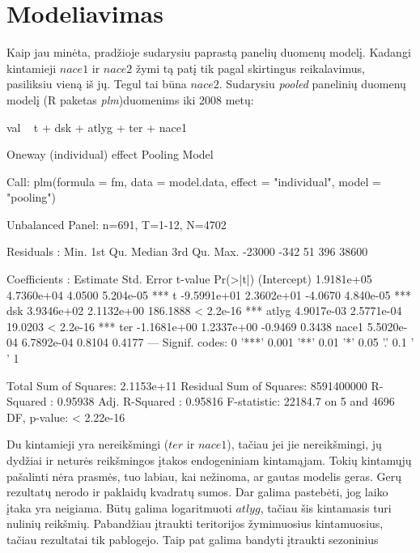 \documentclass[a4paper]{article}
\newcommand{\R}{R}
\begin{document}
\section{Modeliavimas}
Kaip jau minėta, pradžioje sudarysiu paprastą panelių duomenų
modelį. Kadangi kintamieji $nace1$ ir $nace2$ žymi tą patį tik pagal
skirtingus reikalavimus, pasiliksiu vieną iš jų. Tegul tai būna
$nace2$. Sudarysiu \emph{pooled} panelinių duomenų modelį
(\R{} paketas \emph{plm})duomenims iki 2008 metų:
\begin{Schunk}
\begin{Soutput}
val ~ t + dsk + atlyg + ter + nace1
\end{Soutput}
\end{Schunk}
\begin{Schunk}
\begin{Soutput}
Oneway (individual) effect Pooling Model

Call:
plm(formula = fm, data = model.data, effect = "individual", model = "pooling")

Unbalanced Panel: n=691, T=1-12, N=4702

Residuals :
   Min. 1st Qu.  Median 3rd Qu.    Max. 
 -23000    -342      51     396   38600 

Coefficients :
               Estimate  Std. Error  t-value  Pr(>|t|)    
(Intercept)  1.9181e+05  4.7360e+04   4.0500 5.204e-05 ***
t           -9.5991e+01  2.3602e+01  -4.0670 4.840e-05 ***
dsk          3.9346e+02  2.1132e+00 186.1888 < 2.2e-16 ***
atlyg        4.9017e-03  2.5771e-04  19.0203 < 2.2e-16 ***
ter         -1.1681e+00  1.2337e+00  -0.9469    0.3438    
nace1        5.5020e-04  6.7892e-04   0.8104    0.4177    
---
Signif. codes:  0 '***' 0.001 '**' 0.01 '*' 0.05 '.' 0.1 ' ' 1 

Total Sum of Squares:    2.1153e+11
Residual Sum of Squares: 8591400000
R-Squared      :  0.95938 
      Adj. R-Squared :  0.95816 
F-statistic: 22184.7 on 5 and 4696 DF, p-value: < 2.22e-16
\end{Soutput}
\end{Schunk}
Du kintamieji yra nereikšmingi ($ter$ ir $nace1$), tačiau
jei jie nereikšmingi, jų dydžiai ir neturės reikšmingos įtakos
endogeniniam kintamąjam. Tokių kintamųjų pašalinti nėra prasmės, tuo
labiau, kai nežinoma, ar gautas modelis geras. Gerų rezultatų nerodo
ir paklaidų kvadratų sumos. Dar galima pastebėti, jog laiko įtaka yra
neigiama. Būtų galima logaritmuoti $atlyg$, tačiau šis kintamasis
turi nulinių reikšmių. Pabandžiau įtraukti teritorijos žymimuosius
kintamuosius, tačiau rezultatai tik pablogejo. Taip pat galima bandyti įtraukti sezoninius
\end{document}
